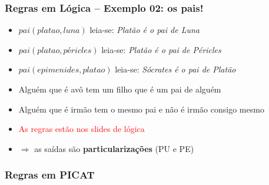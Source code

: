 \documentclass[10pt]{beamer}
\begin{document}
\begin{frame}
    \frametitle{Regras  em Lógica -- Exemplo 02: os pais!}
    \begin{itemize}
    
    \item $pai(platao, luna)$ \hspace{1.5cm} leia-se: \textit{Platão é o pai de Luna}
    \item $pai(platao, péricles)$ \hspace{1.5cm} leia-se: \textit{Platão é o pai de Péricles}
    \item $pai(epimenides, platao)$ \hspace{1.5cm} leia-se: \textit{Sócrates é o pai de Platão}
    
    \pause
    
    \item Alguém que é avô tem um filho que é um pai de alguém
    \pause
    
    \item Alguém que é irmão tem o mesmo pai e não é irmão consigo mesmo
    \pause
    
    \item \textcolor{red}{As regras estão nos slides de lógica}

    \item  $\Rightarrow $ as saídas são \textbf{particularizações} (PU e PE)
 
    \end{itemize}
\end{frame}

\begin{frame}[allowframebreaks=0.9]
 \frametitle{Regras em PICAT}



\end{frame}


\end{document}

